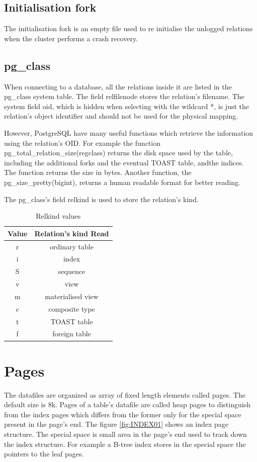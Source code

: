 \subsection{Initialisation fork}
The initialisation fork is an empty file used to re initialise the unlogged relations 
when the cluster performs a crash recovery.

\subsection{pg\_class}
When connecting to a database, all the relations inside it are listed in the 
pg\_class system table. The field relfilenode stores the relation's 
filename. The system field oid, which is hidden when selecting with the wildcard *, is 
just the relation's object identifier and should not be used for the physical 
mapping.\newline

However, PostgreSQL have many useful functions which retrieve the information 
using the relation's OID. For example the function pg\_total\_relation\_size(regclass) 
returns the disk space used by the table, including the additional forks and the eventual 
TOAST table, andthe indices. The function returns the size in bytes. Another function, 
the pg\_size\_pretty(bigint), returns a human readable format for better reading.\newline

The pg\_class's field relkind is used to store the relation's kind.

\begin{table}[h]
  \begin{tabular}{cc}
    Value & Relation's kind 
Read\\ 
    \hline
    r  &  ordinary table \\
    i  &  index \\
    S  &  sequence \\
    v  &  view \\
    m  &  materialised view \\
    c  &  composite type \\
    t  &  TOAST table \\
    f  &  foreign table \\
    
  \end{tabular}
  \caption{\label{tab:RELKIND}Relkind values}
\end{table}

\section{Pages}
The datafiles are organized as array of fixed length elements called pages. The 
default size is 8k. Pages of a table's datafile are called heap 
pages to distinguish from the index pages 
which differs from the former only for the special space present in the page's 
end. The figure \ref{fig:INDEX01} shows an index page structure. The special 
space is small area in the page's end used to track down the index structure. 
For example a B-tree index stores in the special space the pointers to the leaf 
pages.

